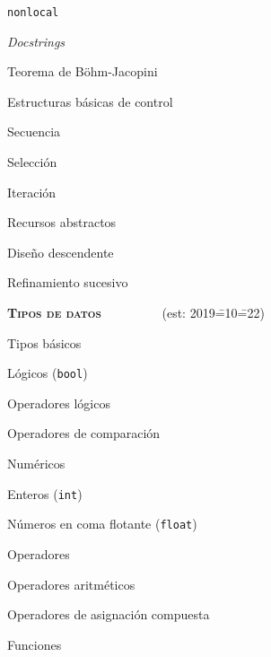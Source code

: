 \begin{longenum}
\begin{longenum}
\begin{longenum}
\begin{longenum}
                \item \texttt{nonlocal}
            \end{longenum}
            \item \textit{Docstrings}
        \end{longenum}
        \item Teorema de Böhm-Jacopini
        \item Estructuras básicas de control
        \begin{longenum}
            \item Secuencia
            \item Selección
            \item Iteración
        \end{longenum}
        \item Recursos abstractos
        \item Diseño descendente
        \item Refinamiento sucesivo
    \end{longenum}
    \item \textbf{\textsc{Tipos de datos}} \ \ \ \ \ \ \ \ \ (est: 2019\==10\==22)
    \begin{longenum}
        \item Tipos básicos
        \begin{longenum}
            \item Lógicos (\texttt{bool})
            \begin{longenum}
                \item Operadores lógicos
                \item Operadores de comparación
            \end{longenum}
            \item Numéricos
            \begin{longenum}
                \item Enteros (\texttt{int})
                \item Números en coma flotante (\texttt{float})
                \item Operadores
                \begin{longenum}
                    \item Operadores aritméticos
                    \item Operadores de asignación compuesta
                \end{longenum}
                \item Funciones

\end{longenum}
\end{longenum}
\end{longenum}
\end{longenum}

